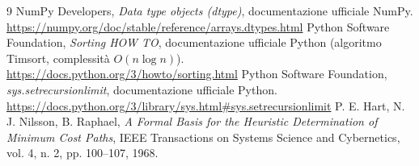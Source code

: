 \documentclass[12pt]{article}
\begin{document}


\renewcommand{\contentsname}{Indice}
\tableofcontents

\newpage
{}


\newpage

\newpage

\newpage

\newpage

\newpage

\newpage


\newpage
\renewcommand{\refname}{Riferimenti bibliografici}
\begin{thebibliography}{9}
 NumPy Developers, \emph{Data type objects (dtype)}, documentazione ufficiale NumPy. \url{https://numpy.org/doc/stable/reference/arrays.dtypes.html}
 Python Software Foundation, \emph{Sorting HOW TO}, documentazione ufficiale Python (algoritmo Timsort, complessità $O(n \log n)$). \url{https://docs.python.org/3/howto/sorting.html}
 Python Software Foundation, \emph{sys.setrecursionlimit}, documentazione ufficiale Python. \url{https://docs.python.org/3/library/sys.html#sys.setrecursionlimit}
 P. E. Hart, N. J. Nilsson, B. Raphael, \emph{A Formal Basis for the Heuristic Determination of Minimum Cost Paths}, IEEE Transactions on Systems Science and Cybernetics, vol. 4, n. 2, pp. 100--107, 1968.
\end{thebibliography}
\end{document}
